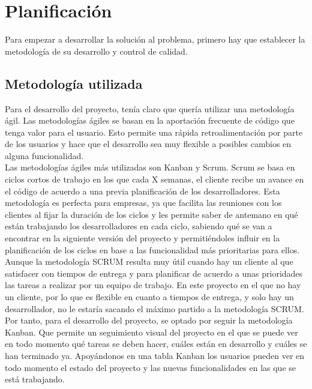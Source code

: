 \chapter{Planificación}
Para empezar a desarrollar la solución al problema, primero hay que establecer la metodología de su desarrollo y control de calidad.

\section{Metodología utilizada}
Para el desarrollo del proyecto, tenía claro que quería utilizar una metodología ágil. Las metodologías ágiles se basan en la aportación frecuente de código que tenga valor para el usuario. Esto permite una rápida retroalimentación por parte de los usuarios y hace que el desarrollo sea muy flexible a posibles cambios en alguna funcionalidad.\\

Las metodologías ágiles más utilizadas son Kanban y Scrum. Scrum se basa en ciclos cortos de trabajo en los que cada X semanas, el cliente recibe un avance en el código de acuerdo a una previa planificación de los desarrolladores. Esta metodología es perfecta para empresas, ya que facilita las reuniones con los clientes al fijar la duración de los ciclos y les permite saber de antemano en qué están trabajando los desarrolladores en cada ciclo, sabiendo qué se van a encontrar en la siguiente versión del proyecto y permitiéndoles influir en la planificación de los ciclos en base a las funcionalidad más prioritarias para ellos. \\

Aunque la metodología SCRUM resulta muy útil cuando hay un cliente al que satisfacer con tiempos de entrega y para planificar de acuerdo a unas prioridades las tareas a realizar por un equipo de trabajo. En este proyecto en el que no hay un cliente, por lo que es flexible en cuanto a tiempos de entrega, y solo hay un desarrollador, no le estaría sacando el máximo partido a la metodología SCRUM.\\

Por tanto, para el desarrollo del proyecto, se optado por seguir la metodología Kanban. Que permite un seguimiento visual del proyecto en el que se puede ver en todo momento qué tareas se deben hacer, cuáles están en desarrollo y cuáles se han terminado ya. Apoyándonos en una tabla Kanban los usuarios pueden ver en todo momento el estado del proyecto y las nuevas funcionalidades en las que se está trabajando. \\

